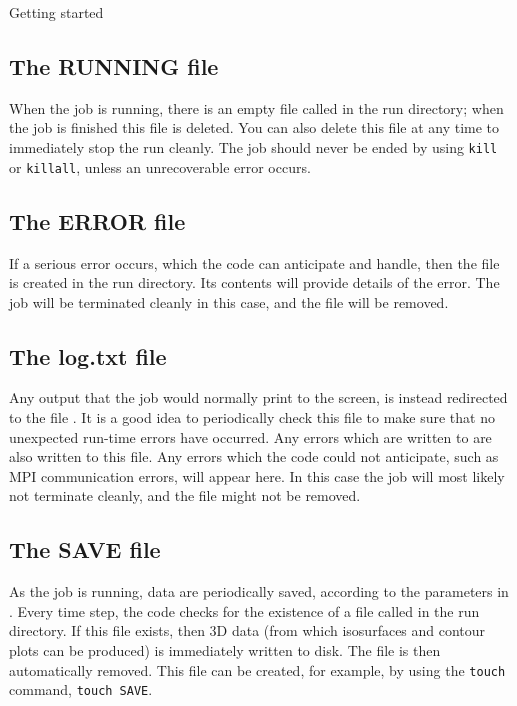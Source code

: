 \begin{chapter}{\label{cha:quickstart}Getting started}
  \subsection{The RUNNING file}
  When the job is running, there is an empty file called  in
  the run directory; when the job is finished this file is deleted.  You can
  also delete this file at any time to immediately stop the run cleanly.  The
  job should never be ended by using \verb"kill" or \verb"killall", unless an
  unrecoverable error occurs.

  \subsection{The ERROR file}
  If a serious error occurs, which the code can anticipate and handle, then the
   file is created in the run directory.  Its contents will
  provide details of the error.  The job will be terminated cleanly in this
  case, and the  file will be removed.

  \subsection{The log.txt file}
  Any output that the job would normally print to the screen, is instead
  redirected to the file .  It is a good idea to periodically
  check this file to make sure that no unexpected run-time errors have
  occurred.  Any errors which are written to  are also written
  to this file.  Any errors which the code could not anticipate, such as MPI
  communication errors, will appear here.  In this case the job will most
  likely not terminate cleanly, and the  file might not be
  removed.

  \subsection{The SAVE file}
  As the job is running, data are periodically saved, according to the
   parameters in .  Every time step, the
  code checks for the existence of a file called  in the run
  directory.  If this file exists, then 3D data (from which isosurfaces and
  contour plots can be produced) is immediately written to disk.  The
   file is then automatically removed.  This file can be created,
  for example, by using the \verb"touch" command, \ie \verb"touch SAVE".


\end{chapter}
